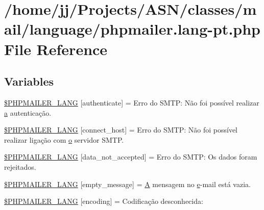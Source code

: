 \hypertarget{phpmailer_8lang-pt_8php}{}\section{/home/jj/\+Projects/\+A\+S\+N/classes/mail/language/phpmailer.lang-\/pt.php File Reference}
\label{phpmailer_8lang-pt_8php}
\subsection*{Variables}
\begin{DoxyCompactItemize}
\item 
\hyperlink{phpmailer_8lang-pt_8php_a2cb33073c989b85580748e331ed8b4aa}{\$\+P\+H\+P\+M\+A\+I\+L\+E\+R\+\_\+\+L\+A\+NG} \mbox{[}\textquotesingle{}authenticate\textquotesingle{}\mbox{]} = \textquotesingle{}Erro do S\+M\+T\+P\+: Não foi possível realizar \hyperlink{_chart_8min_8js_aef3b685c08bc6c76c8e729bd0e93901d}{a} autenticação.\textquotesingle{}
\item 
\hyperlink{phpmailer_8lang-pt_8php_a2ee0cc637a06b96e45600db31c6799ee}{\$\+P\+H\+P\+M\+A\+I\+L\+E\+R\+\_\+\+L\+A\+NG} \mbox{[}\textquotesingle{}connect\+\_\+host\textquotesingle{}\mbox{]} = \textquotesingle{}Erro do S\+M\+T\+P\+: Não foi possível realizar ligação com \hyperlink{fullpage_2plugin_8min_8js_a4afc7c854f61c136d7bcfa8997651b88}{o} servidor S\+M\+T\+P.\textquotesingle{}
\item 
\hyperlink{phpmailer_8lang-pt_8php_a814c6b191205d2361b3233e9c9d6fda5}{\$\+P\+H\+P\+M\+A\+I\+L\+E\+R\+\_\+\+L\+A\+NG} \mbox{[}\textquotesingle{}data\+\_\+not\+\_\+accepted\textquotesingle{}\mbox{]} = \textquotesingle{}Erro do S\+M\+T\+P\+: Os dados foram rejeitados.\textquotesingle{}
\item 
\hyperlink{phpmailer_8lang-pt_8php_a33772099f637c9d6c2cd7425e0e37fed}{\$\+P\+H\+P\+M\+A\+I\+L\+E\+R\+\_\+\+L\+A\+NG} \mbox{[}\textquotesingle{}empty\+\_\+message\textquotesingle{}\mbox{]} = \textquotesingle{}\hyperlink{_chart_8min_8js_a9757042cb6157b0f84e78a5ff4aa6f93}{A} mensagem no \hyperlink{jquery-ui_8min_8js_abea95a4e94bc6f4151d5683d4c12c3f4}{e}-\/mail está vazia.\textquotesingle{}
\item 
\hyperlink{phpmailer_8lang-pt_8php_a817f7283f3d54c970a0c10305cc668cc}{\$\+P\+H\+P\+M\+A\+I\+L\+E\+R\+\_\+\+L\+A\+NG} \mbox{[}\textquotesingle{}encoding\textquotesingle{}\mbox{]} = \textquotesingle{}Codificação desconhecida\+: \textquotesingle{}

\end{DoxyCompactItemize}

